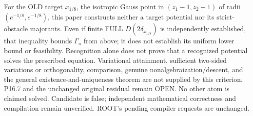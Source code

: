\documentclass[11pt]{article}
\begin{document}
For the OLD target $x_{1/8}$, the isotropic Gauss point in
$(z_1-1,z_2-1)$ of radii $(e^{-1/8},e^{-1/8})$, this paper constructs
neither a target potential nor its strict-obstacle majorants. Even if
finite FULL $D(2\delta_{x_{1/8}})$ is independently established, that
inequality bounds $\Gamma_u$ from above; it does not establish its
uniform lower bound or feasibility. Recognition alone does not prove
that a recognized potential solves the prescribed equation. Variational
attainment, sufficient two-sided variations or orthogonality, comparison,
genuine nonalgebraization/descent, and the general existence-and-uniqueness
theorem are not supplied by this criterion. P16.7 and the unchanged
original residual remain OPEN. No other atom is claimed solved.
Candidate is false; independent mathematical correctness and compilation
remain unverified. ROOT's pending compiler requests are unchanged.
\end{document}
